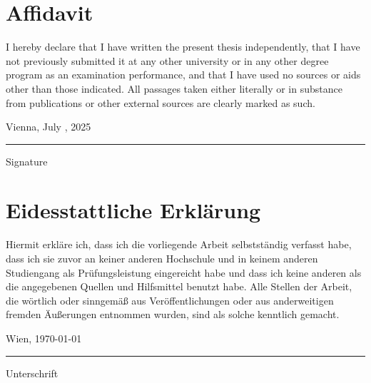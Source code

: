 \documentclass[../../main.tex]{subfiles}
\begin{document}
\section*{Affidavit}

I hereby declare that I have written the present thesis independently, that I have not previously submitted it at any other university or in any other degree program as an examination performance, and that I have used no sources or aids other than those indicated. All passages taken either literally or in substance from publications or other external sources are clearly marked as such.

\vspace{2cm}

Vienna, July , 2025\hspace{2.5cm}\rule{4.5cm}{0.25pt}

\hspace{6.2cm} Signature

\vspace{7cm}

\section*{Eidesstattliche Erklärung}

Hiermit erkläre ich, dass ich die vorliegende Arbeit selbstständig verfasst habe, dass ich sie zuvor an keiner anderen Hochschule und in keinem anderen Studiengang als Prüfungsleistung eingereicht habe und dass ich keine anderen als die angegebenen Quellen und Hilfsmittel benutzt habe. Alle Stellen der Arbeit, die wörtlich oder sinngemäß aus Veröffentlichungen oder aus anderweitigen fremden Äußerungen entnommen wurden, sind als solche kenntlich gemacht. 

\vspace{2cm}

Wien, \germandateformat\today\hspace{2.5cm}\rule{4.5cm}{0.25pt}

\hspace{5.7cm} Unterschrift
\end{document}
